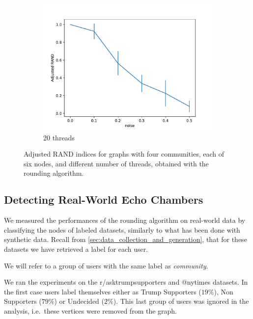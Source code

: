 \begin{figure}
\begin{center}
		\begin{subfigure}[b]{0.3\textwidth}
			\centering
			\includegraphics[width=\textwidth]{tex/out/synthetic_20t/model2_noise_adj_rand.pdf}
			\caption{20 threads}
			\label{fig:tex/out/synthetic_8t/model2_noise_adj_rand.pdf}
		\end{subfigure}
	\end{center}
	\caption{Adjusted RAND indices for graphs with four communities, each of
		six nodes, and different number of threads, obtained with the rounding
		algorithm.}
	\label{fig:clustering-threads}
\end{figure}

\subsection{Detecting Real-World Echo Chambers}%
\label{sub:detecting_real_echo_chambers}

We measured the performances of the rounding algorithm on real-world data by
classifying the nodes of labeled datasets, similarly to what has been done
with synthetic data. Recall from \autoref{sec:data_collection_and_generation},
that for these datasets we have retrieved a label for each user.

We will refer to a group of users with the same label as \emph{community}.

We ran the experiments on the r/asktrumpsupporters and
@nytimes datasets. In the first case users label themselves either as Trump Supporters ($19\%$), Non
Supporters ($79\%$) or Undecided ($2\%$). This last group of users was ignored
in the analysis, i.e.\ these vertices were removed from the graph.

